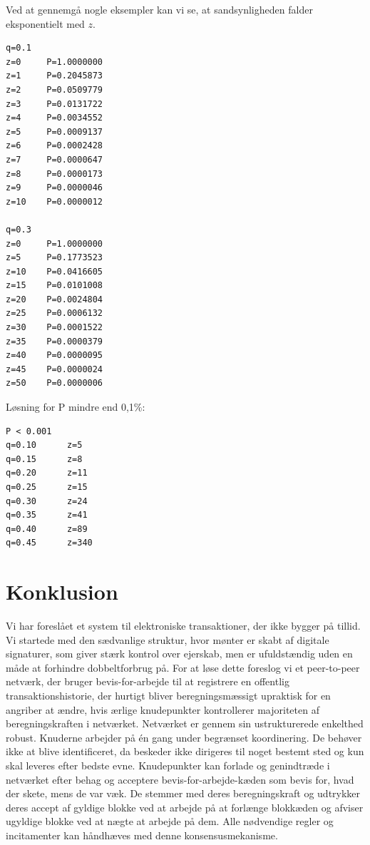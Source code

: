 \documentclass{article}
\begin{document}
Ved at gennemgå nogle eksempler kan vi se, at sandsynligheden falder eksponentielt med $z$. \\

\begin{verbatim}
q=0.1
z=0     P=1.0000000
z=1     P=0.2045873
z=2     P=0.0509779
z=3     P=0.0131722
z=4     P=0.0034552
z=5     P=0.0009137
z=6     P=0.0002428
z=7     P=0.0000647
z=8     P=0.0000173
z=9     P=0.0000046
z=10    P=0.0000012

q=0.3
z=0     P=1.0000000
z=5     P=0.1773523
z=10    P=0.0416605
z=15    P=0.0101008
z=20    P=0.0024804
z=25    P=0.0006132
z=30    P=0.0001522
z=35    P=0.0000379
z=40    P=0.0000095
z=45    P=0.0000024
z=50    P=0.0000006
\end{verbatim}

Løsning for P mindre end 0,1\%: \\

\begin{verbatim}
P < 0.001
q=0.10      z=5
q=0.15      z=8
q=0.20      z=11
q=0.25      z=15
q=0.30      z=24
q=0.35      z=41
q=0.40      z=89
q=0.45      z=340
\end{verbatim}

\section{Konklusion}\label{sec:conclusion}

Vi har foreslået et system til elektroniske transaktioner, der ikke bygger på tillid. Vi startede med den sædvanlige struktur, hvor mønter er skabt af digitale signaturer,
som giver stærk kontrol over ejerskab, men er ufuldstændig uden en måde at forhindre dobbeltforbrug på. For at løse dette foreslog vi et peer-to-peer netværk, der bruger
bevis-for-arbejde til at registrere en offentlig transaktionshistorie, der hurtigt bliver beregningsmæssigt upraktisk for en angriber at ændre, hvis ærlige knudepunkter
kontrollerer majoriteten af beregningskraften i netværket. Netværket er gennem sin ustrukturerede enkelthed robust. Knuderne arbejder på \'en gang under begrænset koordinering.
De behøver ikke at blive identificeret, da beskeder ikke dirigeres til noget bestemt sted og kun skal leveres efter bedste evne. Knudepunkter kan forlade og genindtræde i
netværket efter behag og acceptere bevis-for-arbejde-kæden som bevis for, hvad der skete, mens de var væk. De stemmer med deres beregningskraft og udtrykker deres accept af
gyldige blokke ved at arbejde på at forlænge blokkæden og afviser ugyldige blokke ved at nægte at arbejde på dem. Alle nødvendige regler og incitamenter kan håndhæves
med denne konsensusmekanisme.

\printbibliography
\end{document}
